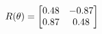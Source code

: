 \documentclass[preview]{standalone}
\begin{document}
\begin{align*}
\special{dvisvgm:raw <g id='unique000'>}R(\theta) = \begin{bmatrix}0.48 & -0.87\\0.87 & 0.48\end{bmatrix}\special{dvisvgm:raw </g>}
\end{align*}
\end{document}

